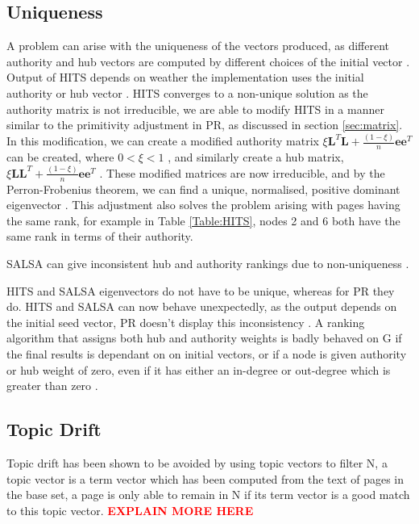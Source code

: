 \documentclass[11pt]{report}
\begin{document}
{\subsection{Uniqueness}
A problem can arise with the uniqueness of the vectors produced, as different authority and hub vectors are computed by different choices of the initial vector \cite{langville}. Output of HITS depends on weather the implementation uses the initial authority or hub vector \cite{farahat2006authority}. HITS converges to a non-unique solution as the authority matrix is not irreducible, we are able to modify HITS in a manner similar to the primitivity adjustment in PR, as discussed in section \ref{sec:matrix}. In this modification, we can create a modified authority matrix \(\xi\textbf{L}^T\textbf{L} +\frac{(1-\xi)}{n}\textbf{ee}^T\) can be created, where $0<\xi<1$ \cite{ng2001stable}, and similarly create a hub matrix, \(\xi\textbf{LL}^T +\frac{(1-\xi)}{n}\textbf{ee}^T\) . These modified matrices are now irreducible, and by the Perron-Frobenius theorem, we can find a unique, normalised, positive dominant eigenvector \cite{meyer2000matrix}. This adjustment also solves the problem arising with pages having the same rank, for example in Table \ref{Table:HITS}, nodes 2 and 6 both have the same rank in terms of their authority.

SALSA can give inconsistent hub and authority rankings due to non-uniqueness \cite{farahat2006authority}.

HITS and SALSA eigenvectors do not have to be unique, whereas for PR they do. HITS and SALSA can now behave unexpectedly, as the output depends on the initial seed vector, PR doesn't display this inconsistency \cite{farahat2006authority}. A ranking algorithm that assigns both hub and authority weights is badly behaved on G if the final results is dependant on on initial vectors, or if a node is given authority or hub weight of zero, even if it has either an in-degree or out-degree which is greater than zero \cite{bonato}. %

\subsection{Topic Drift}

Topic drift has been shown to be avoided by using topic vectors to filter N, a topic vector is a term vector which has been computed from the text of pages in the base set, a page is only able to remain in N if its term vector is a good match to this topic vector. \textcolor{red}{\textbf{EXPLAIN MORE HERE}}

}
\end{document}
